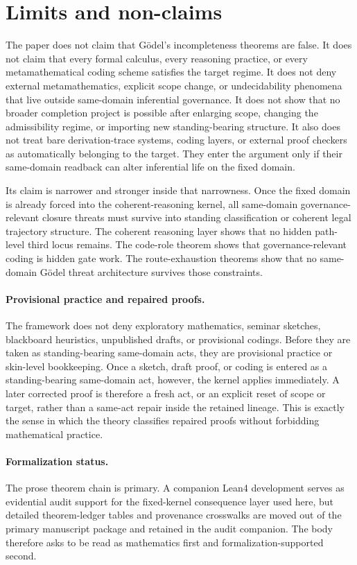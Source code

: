 \section{Limits and non-claims}

The paper does not claim that G\"odel's incompleteness theorems are false. It does not claim that every formal calculus, every reasoning practice, or every metamathematical coding scheme satisfies the target regime. It does not deny external metamathematics, explicit scope change, or undecidability phenomena that live outside same-domain inferential governance. It does not show that no broader completion project is possible after enlarging scope, changing the admissibility regime, or importing new standing-bearing structure. It also does not treat bare derivation-trace systems, coding layers, or external proof checkers as automatically belonging to the target. They enter the argument only if their same-domain readback can alter inferential life on the fixed domain.

Its claim is narrower and stronger inside that narrowness. Once the fixed domain is already forced into the coherent-reasoning kernel, all same-domain governance-relevant closure threats must survive into standing classification or coherent legal trajectory structure. The coherent reasoning layer shows that no hidden path-level third locus remains. The code-role theorem shows that governance-relevant coding is hidden gate work. The route-exhaustion theorems show that no same-domain G\"odel threat architecture survives those constraints.


\paragraph{Provisional practice and repaired proofs.} The framework does not deny exploratory mathematics, seminar sketches, blackboard heuristics, unpublished drafts, or provisional codings. Before they are taken as standing-bearing same-domain acts, they are provisional practice or skin-level bookkeeping. Once a sketch, draft proof, or coding is entered as a standing-bearing same-domain act, however, the kernel applies immediately. A later corrected proof is therefore a fresh act, or an explicit reset of scope or target, rather than a same-act repair inside the retained lineage. This is exactly the sense in which the theory classifies repaired proofs without forbidding mathematical practice.

\paragraph{Formalization status.} The prose theorem chain is primary. A companion Lean4 development serves as evidential audit support for the fixed-kernel consequence layer used here, but detailed theorem-ledger tables and provenance crosswalks are moved out of the primary manuscript package and retained in the audit companion. The body therefore asks to be read as mathematics first and formalization-supported second.